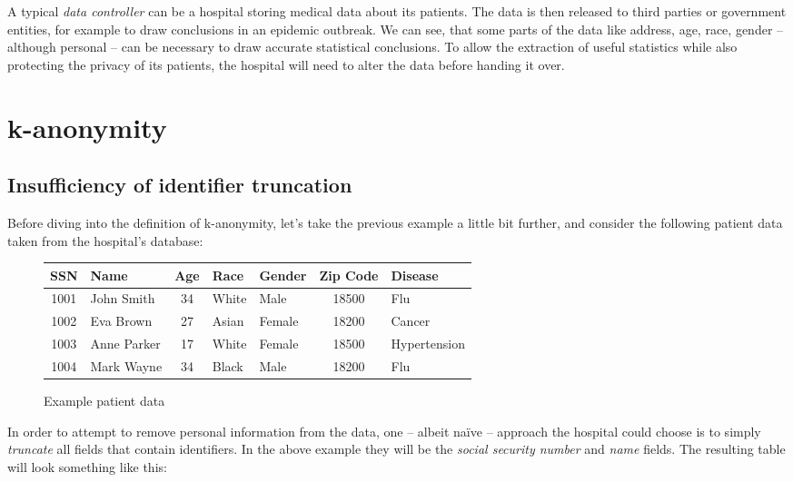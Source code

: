 A typical \textit{data controller} can be a hospital storing medical data about its patients. The data is then released to third parties or government entities, for example to draw conclusions in an epidemic outbreak. We can see, that some parts of the data like address, age, race, gender -- although personal -- can be necessary to draw accurate statistical conclusions. To allow the extraction of useful statistics while also protecting the privacy of its patients, the hospital will need to alter the data before handing it over.

\section{k-anonymity}

\subsection{Insufficiency of identifier truncation} \label{sec:insuff}

Before diving into the definition of k-anonymity, let's take the previous example a little bit further, and consider the following patient data taken from the hospital's database:

\begin{figure}[H]
	\centering
	\begin{tabular}{|c|l|c|l|l|c|l|}
		\hline
		\textbf{SSN} & \textbf{Name} & \textbf{Age} & \textbf{Race} & \textbf{Gender} & \textbf{Zip Code} & \textbf{Disease} \\
		\hline
		1001 & John Smith  & 34 & White & Male   & 18500 & Flu \\
		1002 & Eva Brown   & 27 & Asian & Female & 18200 & Cancer \\
		1003 & Anne Parker & 17 & White & Female & 18500 & Hypertension \\
		1004 & Mark Wayne  & 34 & Black & Male   & 18200 & Flu \\
		\hline
	\end{tabular}
	\caption{Example patient data}
	\label{fig:example-patient-data}
\end{figure}

In order to attempt to remove personal information from the data, one -- albeit naïve -- approach the hospital could choose is to simply \textit{truncate} all fields that contain identifiers. In the above example they will be the \textit{social security number} and \textit{name} fields. The resulting table will look something like this:

